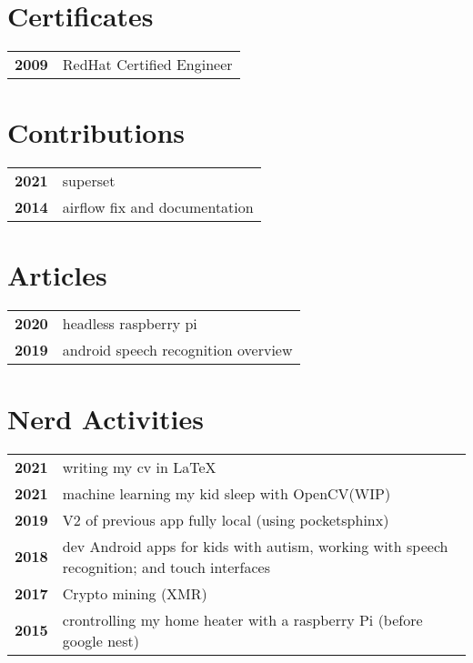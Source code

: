 \documentclass[bluebeige]{hipstercv}
\begin{document}
\begin{paracol}{2}
\begin{minipage}[t]{0.16\textwidth}
 \hspace{1em}
\end{minipage}

\vspace{3em}

\begin{minipage}[t]{0.3\textwidth}
\section*{Certificates}
\begin{tabular}{>{\footnotesize\bfseries}r >{\footnotesize}p{}}
    2009 & RedHat Certified Engineer
\end{tabular}

\section*{Contributions}
\begin{tabular}{>{\footnotesize\bfseries}r >{\footnotesize}p{}}
	2021 & superset\\
	2014 & airflow fix and documentation
\end{tabular}

\section*{Articles}
\begin{tabular}{>{\footnotesize\bfseries}r >{\footnotesize}p{}}
	2020 & headless raspberry pi\\
	2019 & android speech recognition overview
\end{tabular}

\end{minipage}\hfill
\begin{minipage}[t]{0.3\textwidth}
\section*{Nerd Activities}
\begin{tabular}{>{\footnotesize\bfseries}r >{\footnotesize}p{}}
	2021 & writing my cv in \LaTeX\\
	2021 & machine learning my kid sleep with OpenCV(WIP)\\
	2019 & V2 of previous app fully local (using pocketsphinx)\\
    2018 & dev Android apps for kids with autism, working with speech recognition; and touch interfaces\\
	2017 & Crypto mining (XMR)\\
	2015 & crontrolling my home heater with a raspberry Pi (before google nest)
\end{tabular}


\end{minipage}
\end{paracol}
\end{document}
